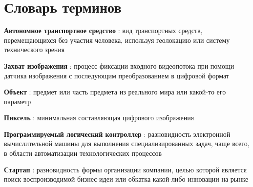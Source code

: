 \chapter*{Словарь терминов}             %

\textbf{Автономное транспортное средство} : вид транспортных средств, перемещающихся без участия человека, используя геолокацию или систему технического зрения

\textbf{Захват изображения} : процесс фиксации входного видеопотока при помощи датчика изображения с последующим преобразованием в цифровой формат

\textbf{Объект} : предмет или часть предмета из реального мира или какой-то его параметр

\textbf{Пиксель} : минимальная составляющая цифрового изображения

\textbf{Программируемый логический контроллер} : разновидность электронной вычислительной машины для выполнения специализированных задач, чаще всего, в области автоматизации технологических процессов

\textbf{Стартап} : разновидность формы организации компании, целью которой является поиск воспроизводимой бизнес-идеи или обкатка какой-либо инновации на рынке